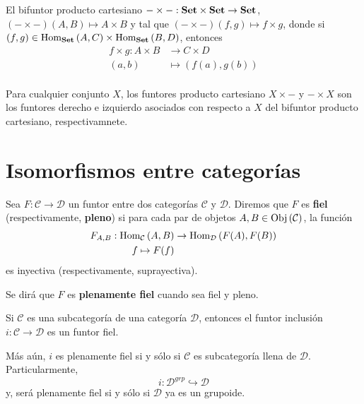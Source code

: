 \documentclass[12pt]{report}
\theoremstyle{largebreak}
\newcommand\cf[3]{\ensuremath{#1:#2\rightarrow#3}}
\newcommand{\Obj}[1]{\ensuremath{\textup{Obj}\left(#1\right)}}
\newcommand{\Hom}[3]{\ensuremath{\textup{Hom}_{#1}\left(#2,#3\right)}}
\newcommand{\Cat}[1]{\ensuremath{\textup{\textbf{#1}}}}
\begin{document}
    \begin{exa}
        El bifuntor producto cartesiano $-\times -:\Cat{Set}\times\Cat{Set}\rightarrow\Cat{Set}$, $(-\times-)(A,B)\mapsto A\times B$ y tal que $(-\times-)(f,g)\mapsto f\times g$, donde si $(f,g)\in\Hom{\Cat{Set}}{A}{C}\times\Hom{\Cat{Set}}{B}{D}$, entonces
        \begin{equation*}
            \begin{split}
                f\times g:A\times B&\rightarrow C\times D\\
                (a,b)&\mapsto (f(a),g(b))\\ 
            \end{split}
        \end{equation*}
    \end{exa}

    \begin{exa}
        Para cualquier conjunto $X$, los funtores producto cartesiano $X\times -$ y $-\times X$ son los funtores derecho e izquierdo asociados con respecto a $X$ del bifuntor producto cartesiano, respectivamnete.
    \end{exa}

    \section{Isomorfismos entre categorías}

    \begin{mydef}
        Sea $\cf{F}{\mathcal{C}}{\mathcal{D}}$ un funtor entre dos categorías $\mathcal{C}$ y $\mathcal{D}$. Diremos que $F$ es \textbf{fiel} (respectivamente, \textbf{pleno}) si para cada par de objetos $A,B\in\Obj{\mathcal{C}}$, la función
        \begin{equation*}
            \begin{split}
                F_{A,B}:\Hom{\mathcal{C}}{A}{B}&\rightarrow\Hom{\mathcal{D}}{F(A)}{F(B)}\\
                f\mapsto F(f)
            \end{split}
        \end{equation*}
        es inyectiva (respectivamente, suprayectiva).

        Se dirá que $F$ es \textbf{plenamente fiel} cuando sea fiel y pleno.
    \end{mydef}

    \begin{exa}
        Si $\mathcal{C}$ es una subcategoría de una categoría $\mathcal{D}$, entonces el funtor inclusión $\cf{i}{\mathcal{C}}{\mathcal{D}}$ es un funtor fiel.

        Más aún, $i$ es plenamente fiel si y sólo si $\mathcal{C}$ es subcategoría llena de $\mathcal{D}$. Particularmente,
        \begin{equation*}
            i:\mathcal{D}^{grp}\hookrightarrow \mathcal{D}
        \end{equation*}
        y, será plenamente fiel si y sólo si $\mathcal{D}$ ya es un grupoide.
    \end{exa}
\end{document}
